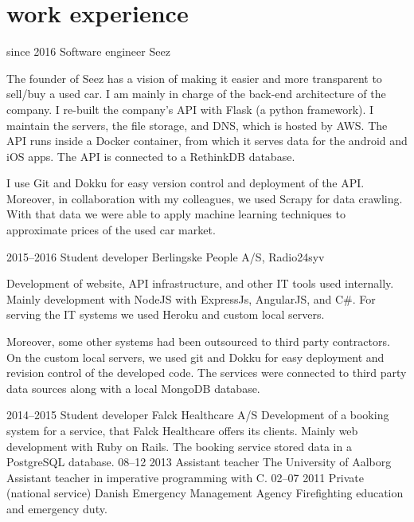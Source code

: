 \documentclass[]{friggeri-cv}
\begin{document}
\section{work experience}

\begin{entrylist}
  \entry
    {since 2016}
    {Software engineer}
    {Seez}
    {
      The founder of Seez has a vision of making it easier and more transparent to sell/buy a used car.
      I am mainly in charge of the back-end architecture of the company.
      I re-built the company's API with Flask (a python framework).
      I maintain the servers, the file storage, and DNS, which is hosted by AWS. 
      The API runs inside a Docker container, from which it serves data for the android and iOS apps.
      The API is connected to a RethinkDB database.

      I use Git and Dokku for easy version control and deployment of the API.
      Moreover, in collaboration with my colleagues, we used Scrapy for data crawling.
      With that data we were able to apply machine learning techniques to approximate prices of the used car market.
	  }
  \entry
    {2015--2016}
    {Student developer}
    {Berlingske People A/S, Radio24syv}
    {
      Development of website, API infrastructure, and other IT tools used internally. 
      Mainly development with NodeJS with ExpressJs, AngularJS, and C\#.
      For serving the IT systems we used Heroku and custom local servers.

      Moreover, some other systems had been outsourced to third party contractors.
      On the custom local servers, we used git and Dokku for easy deployment and revision control of the developed code.
      The services were connected to third party data sources along with a local MongoDB database.
    }
  \entry
    {2014--2015}
    {Student developer}
    {Falck Healthcare A/S}
    {
      Development of a booking system for a service, that Falck Healthcare offers its clients. 
      Mainly web development with Ruby on Rails. The booking service stored data in a PostgreSQL database.
    }
  \entry
    {08–12 2013}
    {Assistant teacher}
    {The University of Aalborg}
    {Assistant teacher in imperative programming with C.}
  \entry
    {02–07 2011}
    {Private (national service)}
    {Danish Emergency Management Agency}
    {Firefighting education and emergency duty.}
\end{entrylist}
\end{document}

